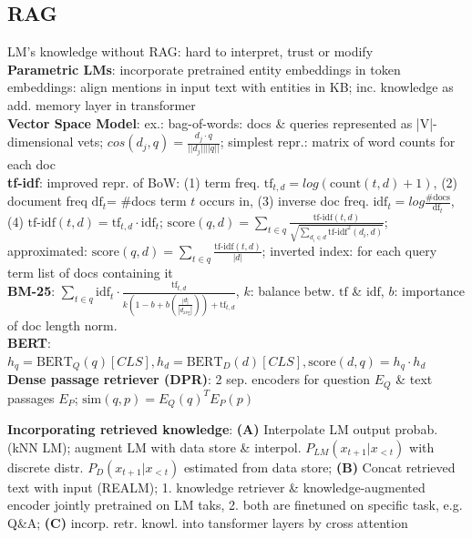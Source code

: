 \subsection{RAG}
LM's knowledge without RAG: hard to interpret, trust or modify \\
\textbf{Parametric LMs}: incorporate pretrained entity embeddings in token embeddings: align mentions in input text with entities in KB; inc. knowledge as add. memory layer in transformer\\
\textbf{Vector Space Model}: ex.: bag-of-words: docs \& queries represented as |V|-dimensional vets;  $cos(d_j, q) = \frac{d_j\cdot q}{||d_j||||q||}$; simplest repr.: matrix of word counts for each doc\\ \textbf{tf-idf}: improved repr. of BoW: (1) term freq. $\text{tf}_{t,d}=log(\text{count}(t,d)+1)$, (2) document freq $\text{df}_t$= \#docs term $t$ occurs in, (3) inverse doc freq. $\text{idf}_t=log \frac{\#\text{docs}}{\text{df}_t}$, (4) $\text{tf-idf}(t,d)=\text{tf}_{t,d}\cdot\text{idf}_t$; $\text{score}(q,d)=\sum_{t\in q}\frac{\text{tf-idf}(t,d)}{\sqrt{\sum_{d_i\in d}\text{tf-idf}^2(d_i,d)}}$; approximated: $\text{score}(q,d)=\sum_{t\in q}\frac{\text{tf-idf}(t,d)}{|d|}$; inverted index: for each query term list of docs containing it\\
\textbf{BM-25}: $\sum_{t\in q} \text{idf}_t\cdot\frac{\text{tf}_{t,d}}{k(1-b+b(\frac{|d|}{|d_\text{avg}|}))+\text{tf}_{t,d}}$, $k$: balance betw. $\text{tf}$ \& $\text{idf}$, $b$: importance of doc length norm.\\
\textbf{BERT}: $h_q = \text{BERT}_Q(q)[CLS], h_d = \text{BERT}_D(d)[CLS], \text{score}(d,q)=h_q\cdot h_d$\\
\textbf{Dense passage retriever (DPR)}: 2 sep. encoders for question $E_Q$ \& text passages $E_P$; $\text{sim}(q,p) = E_Q(q)^T E_P(p)$ 

\textbf{Incorporating retrieved knowledge}: \textbf{(A)} Interpolate LM output probab. (kNN LM); augment LM with data store \& interpol. $P_{LM}(x_{t+1}|x_{<t})$ with discrete distr. $P_D(x_{t+1}|x_{<t})$ estimated from data store; \textbf{(B)} Concat retrieved text with input (REALM); 1. knowledge retriever \& knowledge-augmented encoder jointly pretrained on LM taks, 2. both are finetuned on specific task, e.g. Q\&A; \textbf{(C)} incorp. retr. knowl. into tansformer layers by cross attention